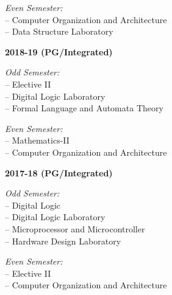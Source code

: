 \documentclass[11pt,a4paper]{moderncv}
\begin{document}
\begin{adjustwidth}{6em}{0pt}
\begin{adjustwidth}{2em}{0pt}
		\textit{Even Semester:} \\
		\hspace*{1.5em}-- Computer Organization and Architecture \\
		\hspace*{1.5em}-- Data Structure Laboratory \\
	\end{adjustwidth}
	

	
	\textbf{2018-19 (PG/Integrated)}
	
	\begin{adjustwidth}{2em}{0pt}
		\textit{Odd Semester:} \\
		\hspace*{1.5em}-- Elective II \\
		\hspace*{1.5em}-- Digital Logic Laboratory \\
		\hspace*{1.5em}-- Formal Language and Automata Theory 
		
		\textit{Even Semester:} \\
		\hspace*{1.5em}-- Mathematics-II \\
		\hspace*{1.5em}-- Computer Organization and Architecture \\
	\end{adjustwidth}
	

	
	\textbf{2017-18 (PG/Integrated)}
	
	\begin{adjustwidth}{2em}{0pt}
		\textit{Odd Semester:} \\
		\hspace*{1.5em}-- Digital Logic \\
		\hspace*{1.5em}-- Digital Logic Laboratory \\
		\hspace*{1.5em}-- Microprocessor and Microcontroller \\
		\hspace*{1.5em}-- Hardware Design Laboratory 
		
		\textit{Even Semester:} \\
		\hspace*{1.5em}-- Elective II \\
		\hspace*{1.5em}-- Computer Organization and Architecture \\
	\end{adjustwidth}
	


\end{adjustwidth}
\end{document}
